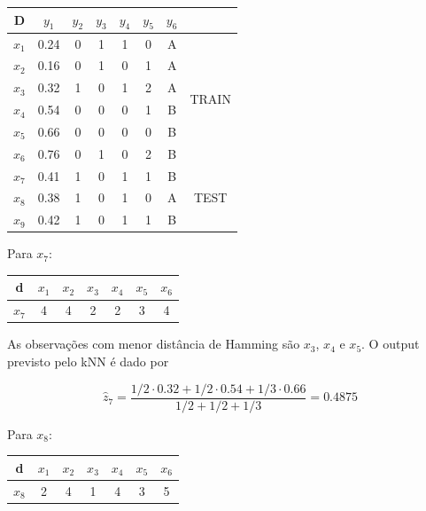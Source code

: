 \documentclass[a4paper,12pt]{article} %
\begin{document}
\begin{enumerate}
\begin{table}[H]
    \centering
    \begin{tabular}{cccccccc}
    D  & $y_1$   & $y_2$ & $y_3$ & $y_4$ & $y_5$ & $y_6$ &         \\ \hline
    $x_1$ & 0.24 & 0  & 1  & 1  & 0  & A  & \multirow{6}{*}{TRAIN} \\
    $x_2$ & 0.16 & 0  & 1  & 0  & 1  & A  &                        \\
    $x_3$ & 0.32 & 1  & 0  & 1  & 2  & A  &                        \\
    $x_4$ & 0.54 & 0  & 0  & 0  & 1  & B  &                        \\
    $x_5$ & 0.66 & 0  & 0  & 0  & 0  & B  &                        \\
    $x_6$ & 0.76 & 0  & 1  & 0  & 2  & B  &                        \\ \hline
    $x_7$ & 0.41 & 1  & 0  & 1  & 1  & B  & \multirow{3}{*}{TEST}  \\
    $x_8$ & 0.38 & 1  & 0  & 1  & 0  & A  &                        \\
    $x_9$ & 0.42 & 1  & 0  & 1  & 1  & B  &                       
    \end{tabular}
\end{table}

Para $x_7$:

\begin{table}[H]
    \centering
    \begin{tabular}{c|cccccc}
    d      & $x_1$ & $x_2$ & $x_3$ & $x_4$ & $x_5$ & $x_6$ \\ \hline
    $x_7$  & 4     & 4     & 2     & 2     & 3     & 4    
    \end{tabular}
\end{table}

As observações com menor distância de Hamming são $x_3$, $x_4$ e $x_5$. O output previsto pelo kNN é dado por 

\begin{equation*}
    \hat{z}_{7} = \frac{1/2 \cdot 0.32 + 1/2 \cdot 0.54 + 1/3 \cdot 0.66}{1/2 + 1/2 + 1/3} = 0.4875
\end{equation*}

Para $x_8$:

\begin{table}[H]
    \centering
    \begin{tabular}{c|cccccc}
    d      & $x_1$ & $x_2$ & $x_3$ & $x_4$ & $x_5$ & $x_6$ \\ \hline
    $x_8$  & 2     & 4     & 1     & 4     & 3     & 5    
    \end{tabular}
    \end{table}


\end{enumerate}
\end{document}

